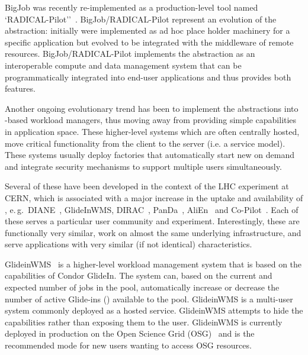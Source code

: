\documentclass{sig-alternate}
\begin{document}

BigJob was recently re-implemented as a production-level tool named
`RADICAL-Pilot''~\cite{radical_pilot_paper}. BigJob/RADICAL-Pilot represent an
evolution of the \pilot abstraction: initially \pilot were implemented as ad hoc
place holder machinery for a specific application but evolved to be integrated
with the middleware of remote resources. BigJob/RADICAL-Pilot implements the
\pilot abstraction as an interoperable compute and data management system that
can be programmatically integrated into end-user applications and thus provides
both features.

Another ongoing evolutionary trend has been to implement the \pilot abstractions
into \pilot-based workload managers, thus moving away from providing simple
\pilot capabilities in application space. These higher-level systems which are
often centrally hosted, move critical functionality from the client to the
server (i.e. a service model). These systems usually deploy \pilot factories
that automatically start new \pilots on demand and integrate security mechanisms
to support multiple users simultaneously.

Several of these have been developed in the context of the LHC experiment at
CERN, which is associated with a major increase in the uptake and availability
of \pilots, e.\,g.\ DIANE~\cite{Moscicki:908910}, GlideInWMS,
DIRAC~\cite{1742-6596-219-6-062049}, PanDa~\cite{1742-6596-331-7-072069},
AliEn~\cite{1742-6596-119-6-062012} and Co-Pilot~\cite{copilot-tr}. Each of
these \pilots serves a particular user community and experiment. Interestingly,
these \pilots are functionally very similar, work on almost the same underlying
infrastructure, and serve applications with very similar (if not identical)
characteristics. 

GlideinWMS~\cite{1742-6596-119-6-062044} is a higher-level workload management
system that is based on the \pilot capabilities of Condor GlideIn. The system
can, based on the current and expected number of jobs in the pool, automatically
increase or decrease the number of active Glide-ins (\pilots) available to the
pool. GlideinWMS is a multi-user \pilotjob system commonly deployed as a hosted
service. GlideinWMS attempts to hide the \pilot capabilities rather than
exposing them to the user. GlideinWMS is currently deployed in production on the
Open Science Grid (OSG)~\cite{url_osg} and is the recommended mode for new users
wanting to access OSG resources.
\end{document}
